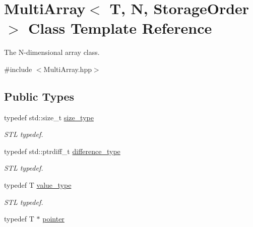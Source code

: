 \hypertarget{class_d_o_1_1_multi_array}{\section{Multi\-Array$<$ T, N, Storage\-Order $>$ Class Template Reference}
\label{class_d_o_1_1_multi_array}
}


The N-\/dimensional array class.  




{\ttfamily \#include $<$Multi\-Array.\-hpp$>$}

\subsection*{Public Types}
\begin{DoxyCompactItemize}
\item 
\hypertarget{class_d_o_1_1_multi_array_a89a6dcafb6130e3e1bcd6d1285e0dd6f}{typedef std\-::size\-\_\-t \hyperlink{class_d_o_1_1_multi_array_a89a6dcafb6130e3e1bcd6d1285e0dd6f}{size\-\_\-type}}\label{class_d_o_1_1_multi_array_a89a6dcafb6130e3e1bcd6d1285e0dd6f}

\begin{DoxyCompactList}\small\item\em S\-T\-L typedef. \end{DoxyCompactList}\item 
\hypertarget{class_d_o_1_1_multi_array_ad319fc54a93a2c7058c70e40428ed2e2}{typedef std\-::ptrdiff\-\_\-t \hyperlink{class_d_o_1_1_multi_array_ad319fc54a93a2c7058c70e40428ed2e2}{difference\-\_\-type}}\label{class_d_o_1_1_multi_array_ad319fc54a93a2c7058c70e40428ed2e2}

\begin{DoxyCompactList}\small\item\em S\-T\-L typedef. \end{DoxyCompactList}\item 
\hypertarget{class_d_o_1_1_multi_array_a265a253612b46abed17c61b0a5e5ce30}{typedef T \hyperlink{class_d_o_1_1_multi_array_a265a253612b46abed17c61b0a5e5ce30}{value\-\_\-type}}\label{class_d_o_1_1_multi_array_a265a253612b46abed17c61b0a5e5ce30}

\begin{DoxyCompactList}\small\item\em S\-T\-L typedef. \end{DoxyCompactList}\item 
\hypertarget{class_d_o_1_1_multi_array_a680c78d51cff3fd301666dd75bdbe49d}{typedef T $\ast$ \hyperlink{class_d_o_1_1_multi_array_a680c78d51cff3fd301666dd75bdbe49d}{pointer}}\label{class_d_o_1_1_multi_array_a680c78d51cff3fd301666dd75bdbe49d}


\end{DoxyCompactItemize}
